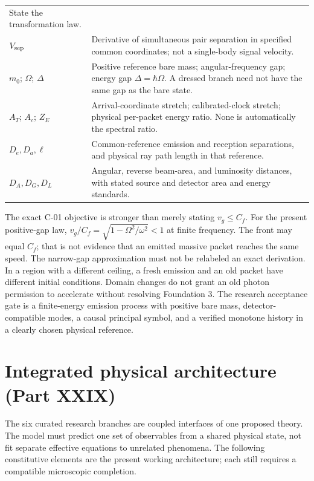 \documentclass[
  11pt,
  twoside]{article}
\begin{document}
\begin{longtable}[]{@{}
  >{\raggedright\arraybackslash}p{}
  >{\raggedright\arraybackslash}p{}@{}}
State the transformation law. \\
\(V_{\rm sep}\) & Derivative of simultaneous pair separation in
specified common coordinates; not a single-body signal velocity. \\
\(m_0\); \(\Omega\); \(\Delta\) & Positive reference bare mass;
angular-frequency gap; energy gap \(\Delta=\hbar\Omega\). A dressed
branch need not have the same gap as the bare state. \\
\(A_T\); \(A_c\); \(Z_E\) & Arrival-coordinate stretch; calibrated-clock
stretch; physical per-packet energy ratio. None is automatically the
spectral ratio. \\
\(D_e,D_a,\ell\) & Common-reference emission and reception separations,
and physical ray path length in that reference. \\
\(D_A,D_G,D_L\) & Angular, reverse beam-area, and luminosity distances,
with stated source and detector area and energy standards. \\
\end{longtable}

The exact C-01 objective is stronger than merely stating
\(v_g\leq C_f\). For the present positive-gap law,
\(v_g/C_f=\sqrt{1-\Omega^2/\omega^2}<1\) at finite frequency. The front
may equal \(C_f\); that is not evidence that an emitted massive packet
reaches the same speed. The narrow-gap approximation must not be
relabeled an exact derivation. In a region with a different ceiling, a
fresh emission and an old packet have different initial conditions.
Domain changes do not grant an old photon permission to accelerate
without resolving Foundation 3. The research acceptance gate is a
finite-energy emission process with positive bare mass,
detector-compatible modes, a causal principal symbol, and a verified
monotone history in a clearly chosen physical reference.

\section{Integrated physical architecture (Part
XXIX)}\label{integrated-physical-architecture-part-xxix}

The six curated research branches are coupled interfaces of one proposed
theory. The model must predict one set of observables from a shared
physical state, not fit separate effective equations to unrelated
phenomena. The following constitutive elements are the present working
architecture; each still requires a compatible microscopic completion.
\end{document}

